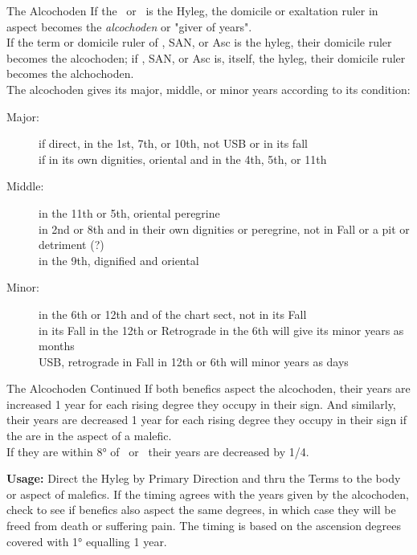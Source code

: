 \begin{frame}[t]{The Alcochoden}
If the \Sun\ or \Moon\ is the Hyleg, the domicile or exaltation ruler in aspect becomes the \textsl{alcochoden} or "giver of years". \\

\vspace{0.2cm}
If the term or domicile ruler of \Fortune, SAN, or Asc is the hyleg, their domicile ruler becomes the alcochoden; if \Fortune, SAN, or Asc is, itself, the hyleg, their domicile ruler becomes the alchochoden.\\

\vspace{0.2cm}
The alcochoden gives its major, middle, or minor years according to its condition:
\begin{description}
\item[Major:] if direct, in the 1st, 7th, or 10th, not USB or in its fall \\
	if in its own dignities, oriental and in the 4th, 5th, or 11th
\item[Middle:] in the 11th or 5th, oriental peregrine \\
	in 2nd or 8th and in their own dignities or peregrine, not in Fall or a pit or detriment (?) \\
	in the 9th, dignified and oriental
\item[Minor:] in the 6th or 12th and of the chart sect, not in its Fall \\
	in its Fall in the 12th or Retrograde in the 6th will give its minor years as months \\
	USB, retrograde in Fall in 12th or 6th will minor years as days
	
\end{description}

\end{frame}
\begin{frame}[t]{The Alcochoden Continued}
If both benefics aspect the alcochoden, their years are increased 1 year for each rising degree they occupy in their sign. And similarly, their years are decreased 1 year for each rising  degree they occupy in their sign if the are in the aspect of a malefic. \\

\vspace{0.25cm}
If they are within 8° of \NorthNode\ or \SouthNode\ their years are decreased by 1/4.

\textbf{Usage:}
Direct the Hyleg by Primary Direction and thru the Terms to the body or aspect of malefics. If the timing agrees with the years given by the alcochoden, check to see if benefics also aspect the same degrees, in which case they will be freed from death or suffering pain. The timing is based on the ascension degrees covered with 1° equalling 1 year.

\end{frame}

